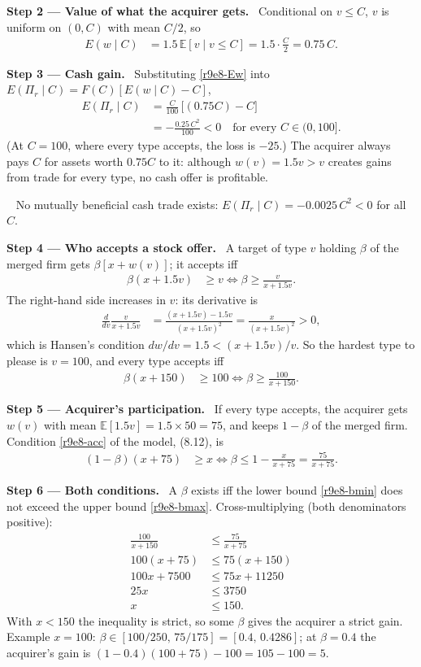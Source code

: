 \documentclass[11pt,a4paper]{article}
\newcommand{\step}[2]{\par\medskip\noindent\textbf{Step #1 --- #2.}~}
\newcommand{\answer}[1]{\par\smallskip\noindent\fbox{\textbf{Answer #1.}}~}
\newcommand{\E}{\mathbb{E}}
\begin{document}
\step{2}{Value of what the acquirer gets} Conditional on $v\le C$, $v$ is uniform on $(0,C)$ with mean
$C/2$, so
\begin{align}
  E(w\mid C) &= 1.5\,\E[v\mid v\le C] = 1.5\cdot\frac{C}{2} = 0.75\,C. \label{r9e8-Ew}
\end{align}

\step{3}{Cash gain} Substituting \eqref{r9e8-Ew} into $E(\Pi_r\mid C)=F(C)[E(w\mid C)-C]$,
\begin{align}
  E(\Pi_r\mid C) &= \frac{C}{100}\,\big[(0.75C)-C\big] \nonumber\\
                 &= -\frac{0.25\,C^2}{100} < 0 \quad\text{for every } C\in(0,100]. \label{r9e8-cash}
\end{align}
(At $C=100$, where every type accepts, the loss is $-25$.) The acquirer always pays $C$ for assets worth
$0.75C$ to it: although $w(v)=1.5v>v$ creates gains from trade for every type, no cash offer is
profitable.
\answer{(cash)} No mutually beneficial cash trade exists: $E(\Pi_r\mid C)=-0.0025\,C^2<0$ for all $C$.

\step{4}{Who accepts a stock offer} A target of type $v$ holding $\beta$ of the merged firm gets
$\beta[x+w(v)]$; it accepts iff
\begin{align}
  \beta(x+1.5v) &\ge v \iff \beta \ge \frac{v}{x+1.5v}. \label{r9e8-acc}
\end{align}
The right-hand side increases in $v$: its derivative is
\begin{align}
  \frac{d}{dv}\frac{v}{x+1.5v} &= \frac{(x+1.5v)-1.5v}{(x+1.5v)^2} = \frac{x}{(x+1.5v)^2} > 0, \nonumber
\end{align}
which is Hansen's condition $dw/dv=1.5<(x+1.5v)/v$. So the hardest type to please is $v=100$, and every
type accepts iff
\begin{align}
  \beta(x+150) &\ge 100 \iff \beta \ge \frac{100}{x+150}. \label{r9e8-bmin}
\end{align}

\step{5}{Acquirer's participation} If every type accepts, the acquirer gets $w(v)$ with mean
$\E[1.5v]=1.5\times 50=75$, and keeps $1-\beta$ of the merged firm. Condition \eqref{r9e8-acc} of the
model, (8.12), is
\begin{align}
  (1-\beta)(x+75) &\ge x \iff \beta \le 1-\frac{x}{x+75} = \frac{75}{x+75}. \label{r9e8-bmax}
\end{align}

\step{6}{Both conditions} A $\beta$ exists iff the lower bound \eqref{r9e8-bmin} does not exceed the
upper bound \eqref{r9e8-bmax}. Cross-multiplying (both denominators positive):
\begin{align}
  \frac{100}{x+150} &\le \frac{75}{x+75} \nonumber\\
  100(x+75) &\le 75(x+150) \nonumber\\
  100x+7500 &\le 75x+11250 \nonumber\\
  25x &\le 3750 \nonumber\\
  x &\le 150. \label{r9e8-x}
\end{align}
With $x<150$ the inequality is strict, so some $\beta$ gives the acquirer a strict gain. Example $x=100$:
$\beta\in[100/250,\,75/175]=[0.4,\,0.4286]$; at $\beta=0.4$ the acquirer's gain is
$(1-0.4)(100+75)-100=105-100=5$.
\end{document}
